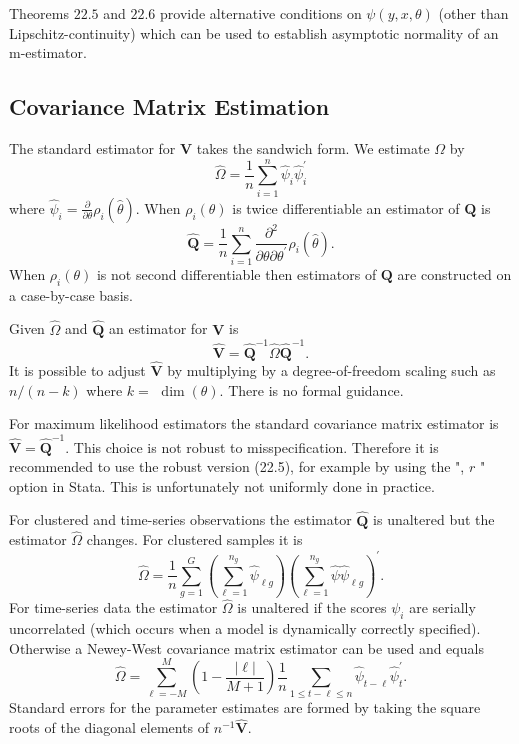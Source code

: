 \documentclass[10pt]{article}
\begin{document}
Theorems $22.5$ and $22.6$ provide alternative conditions on $\psi(y, x, \theta)$ (other than Lipschitz-continuity) which can be used to establish asymptotic normality of an m-estimator.

\subsection{Covariance Matrix Estimation}
The standard estimator for $\boldsymbol{V}$ takes the sandwich form. We estimate $\Omega$ by
$$
\widehat{\Omega}=\frac{1}{n} \sum_{i=1}^{n} \widehat{\psi}_{i} \widehat{\psi}_{i}^{\prime}
$$
where $\widehat{\psi}_{i}=\frac{\partial}{\partial \theta} \rho_{i}(\widehat{\theta})$. When $\rho_{i}(\theta)$ is twice differentiable an estimator of $\boldsymbol{Q}$ is
$$
\widehat{\boldsymbol{Q}}=\frac{1}{n} \sum_{i=1}^{n} \frac{\partial^{2}}{\partial \theta \partial \theta^{\prime}} \rho_{i}(\widehat{\theta}) .
$$
When $\rho_{i}(\theta)$ is not second differentiable then estimators of $\boldsymbol{Q}$ are constructed on a case-by-case basis.

Given $\widehat{\Omega}$ and $\widehat{\boldsymbol{Q}}$ an estimator for $\boldsymbol{V}$ is
$$
\widehat{\boldsymbol{V}}=\widehat{\boldsymbol{Q}}^{-1} \widehat{\Omega} \widehat{\boldsymbol{Q}}^{-1} .
$$
It is possible to adjust $\widehat{\boldsymbol{V}}$ by multiplying by a degree-of-freedom scaling such as $n /(n-k)$ where $k=$ $\operatorname{dim}(\theta)$. There is no formal guidance.

For maximum likelihood estimators the standard covariance matrix estimator is $\widehat{\boldsymbol{V}}=\widehat{\boldsymbol{Q}}^{-1}$. This choice is not robust to misspecification. Therefore it is recommended to use the robust version (22.5), for example by using the ", $r$ " option in Stata. This is unfortunately not uniformly done in practice.

For clustered and time-series observations the estimator $\widehat{\boldsymbol{Q}}$ is unaltered but the estimator $\widehat{\Omega}$ changes. For clustered samples it is
$$
\widehat{\Omega}=\frac{1}{n} \sum_{g=1}^{G}\left(\sum_{\ell=1}^{n_{g}} \widehat{\psi}_{\ell g}\right)\left(\sum_{\ell=1}^{n_{g}} \widehat{\psi} \widehat{\psi}_{\ell g}\right)^{\prime} .
$$
For time-series data the estimator $\widehat{\Omega}$ is unaltered if the scores $\psi_{i}$ are serially uncorrelated (which occurs when a model is dynamically correctly specified). Otherwise a Newey-West covariance matrix estimator can be used and equals
$$
\widehat{\Omega}=\sum_{\ell=-M}^{M}\left(1-\frac{|\ell|}{M+1}\right) \frac{1}{n} \sum_{1 \leq t-\ell \leq n} \widehat{\psi}_{t-\ell} \widehat{\psi}_{t}^{\prime} .
$$
Standard errors for the parameter estimates are formed by taking the square roots of the diagonal elements of $n^{-1} \widehat{\boldsymbol{V}}$.
\end{document}
